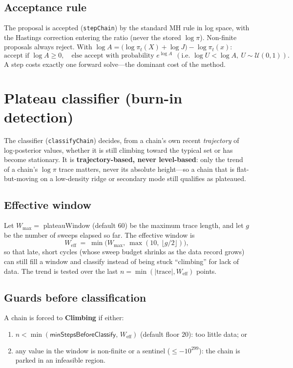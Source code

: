 \documentclass[11pt]{article}
\newcommand{\code}[1]{\texttt{\small #1}}
\newcommand{\param}[1]{\textsf{#1}}
\begin{document}
\subsection{Acceptance rule}
The proposal is accepted (\code{stepChain}) by the standard MH rule in
log space, with the Hastings correction entering the ratio (never the
stored $\log\pi$). Non-finite proposals always reject. With
$\log A = \big(\log\pi_t(X) + \log J\big) - \log\pi_t(x)$:
\begin{equation}
  \text{accept if } \log A \ge 0,\quad
  \text{else accept with probability } e^{\log A}
  \ \ (\text{i.e. } \log U < \log A,\ U\sim\mathcal U(0,1)).
\end{equation}
A step costs exactly one forward solve---the dominant cost of the method.

\section{Plateau classifier (burn-in detection)}\label{sec:plateau}

The classifier (\code{classifyChain}) decides, from a chain's own recent
\emph{trajectory} of log-posterior values, whether it is still climbing
toward the typical set or has become stationary. It is
\textbf{trajectory-based, never level-based}: only the trend of a chain's
$\log\pi$ trace matters, never its absolute height---so a chain that is
flat-but-moving on a low-density ridge or secondary mode still qualifies
as plateaued.

\subsection{Effective window}
Let $W_{\max}=$ \param{plateauWindow} (default $60$) be the maximum trace
length, and let $g$ be the number of sweeps elapsed so far. The effective
window is
\begin{equation}
  W_{\text{eff}} \;=\; \min\!\big(W_{\max},\ \max(10,\ \lfloor g/2\rfloor)\big),
\end{equation}
so that late, short cycles (whose sweep budget shrinks as the data record
grows) can still fill a window and classify instead of being stuck
``climbing'' for lack of data. The trend is tested over the last
$n=\min(|\text{trace}|, W_{\text{eff}})$ points.

\subsection{Guards before classification}
A chain is forced to \textbf{Climbing} if either:
\begin{enumerate}[nosep,leftmargin=1.6em]
  \item $n < \min(\param{minStepsBeforeClassify},\,W_{\text{eff}})$
  (default floor $20$): too little data; or
  \item any value in the window is non-finite or a sentinel
  ($\le -10^{299}$): the chain is parked in an infeasible region.
\end{enumerate}
\end{document}
